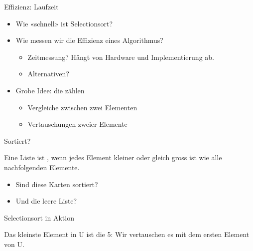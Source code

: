 \expandafter\documentclass\expandafter[\designopts]{beamer}
\begin{document}
\begin{frame}{Effizienz: Laufzeit}
  \begin{itemize}
    \item Wie «schnell» ist Selectionsort?
    \item Wie messen wir die Effizienz eines Algorithmus?
    \begin{itemize}
      \item Zeitmessung? Hängt von Hardware und Implementierung ab.
      \item Alternativen?
    \end{itemize}
    \item Grobe Idee: die  zählen
    \begin{itemize}
      \item Vergleiche zwischen zwei Elementen
      \item Vertauschungen zweier Elemente
    \end{itemize}
  \end{itemize}
\end{frame}

\begin{frame}{Sortiert?}
  \begin{concept}
    Eine Liste ist , wenn jedes Element kleiner oder gleich gross ist
    wie alle nachfolgenden Elemente.
  \end{concept}
  \begin{itemize}
    \item Sind diese Karten sortiert?
    \item Und die leere Liste?
  \end{itemize}
\end{frame}

\begin{frame}{Selectionsort in Aktion}
  \vspace*{2mm}

  \vspace{12mm}\centering Das kleinste Element in U ist die 5: Wir vertauschen es mit dem ersten Element von U.
\end{frame}
\end{document}
